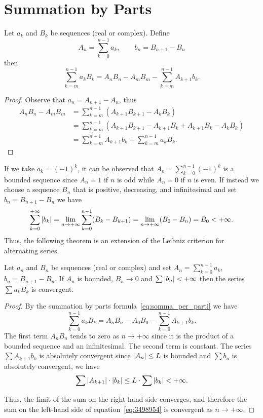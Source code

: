 \section{Summation by Parts}
\begin{theorem}
\label{th:somma_per_parti}%
Let $a_k$ and $B_k$ be sequences (real or complex).
Define
\[
  A_n = \sum_{k=0}^{n-1} a_k, \qquad
  b_n = B_{n+1} - B_n
\]
then
%
%
\begin{equation}\label{eq:somma_per_parti}
 \sum_{k=m}^{n-1} a_k B_k = A_n B_n - A_m B_m - \sum_{k=m}^{n-1} A_{k+1}b_k.
\end{equation}
\end{theorem}
%
\begin{proof}
Observe that $a_n = A_{n+1}-A_n$, thus
\begin{align*}
  A_n B_n - A_m B_m
  &= \sum_{k=m}^{n-1} (A_{k+1}B_{k+1}-A_k B_k)\\
  &= \sum_{k=m}^{n-1} (A_{k+1}B_{k+1}-A_{k+1}B_k + A_{k+1}B_k - A_k B_k)\\
  &= \sum_{k=m}^{n-1} A_{k+1}b_k + \sum_{k=m}^{n-1} a_k B_k.
\end{align*}
\end{proof}

If we take $a_k=(-1)^k$, it can be observed that $A_n = \sum_{k=0}^{n-1} (-1)^k$
is a bounded sequence since $A_n = 1$ if $n$ is odd while
$A_n=0$ if $n$ is even.
If instead we choose a sequence $B_n$ that is positive,
decreasing, and infinitesimal
and set $b_n = B_{n+1}-B_n$
we have
\[
  \sum_{k=0}^{+\infty} {\left|b_k\right|}
  = \lim_{n\to+\infty}\sum_{k=0}^{n-1} (B_k-B_{k+1})
  = \lim_{n\to +\infty} (B_0 - B_n) = B_0 < +\infty.
\]
Thus, the following theorem is an extension of the
Leibniz criterion for alternating series.

\begin{theorem}%
\label{th:dirichlet}%
%
%
Let $a_n$ and $B_n$ be sequences (real or complex)
and set $\displaystyle A_n = \sum_{k=0}^{n-1} a_k$,
$b_n = B_{n+1} - B_n$.
If $A_n$ is bounded,
$B_n\to 0$
and $\sum {\left|b_n\right|} < +\infty$
then the series $\sum a_k B_k$ is convergent.
\end{theorem}
%
\begin{proof}
By the summation by parts formula~\eqref{eq:somma_per_parti}
 we have
\begin{equation}\label{eq:3498954}
 \sum_{k=0}^{n-1} a_k B_k
 = A_n B_n - A_0 B_0 - \sum_{k=0}^{n-1} A_{k+1}b_k.
\end{equation}
The first term $A_n B_n$ tends to zero as $n\to +\infty$
since it is the product of a bounded sequence and an infinitesimal.
The second term is constant.
The series $\sum A_{k+1} b_k$ is absolutely convergent
since ${\left|A_n\right|}\le L$ is bounded
and $\sum b_n$ is absolutely convergent, we have
\[
  \sum {\left|A_{k+1}\right|} \cdot {\left|b_k\right|}
  \le L \cdot \sum {\left|b_k\right|} < +\infty.
\]

Thus, the limit of the sum on the right-hand side converges, and therefore
the sum on the left-hand side
of equation~\eqref{eq:3498954}
is convergent as $n\to +\infty$.
\end{proof}

